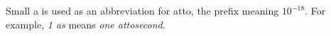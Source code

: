 Small a is used as an abbreviation for atto, the prefix meaning $10^{-18}.$  For example, \textit{1 as} means \textit{one attosecond}.